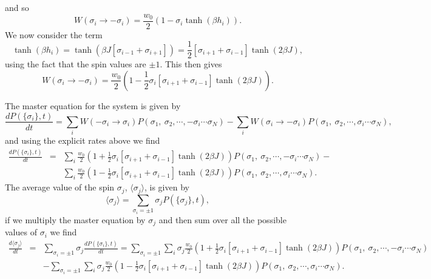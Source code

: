 \documentclass[11pt]{report}
\begin{document}
and so
\begin{equation}
W(\sigma_i\to-\sigma_i)= \frac{w_0}{2}(1- \sigma_i \tanh(\beta h_i)).
\end{equation}
We now consider the term
\begin{equation}
\tanh(\beta h_i) = \tanh(\beta J [\sigma_{i-1}+ \sigma_{i+1}])
= \frac{1}{2}[\sigma_{i+1}+\sigma_{i-1}]\tanh(2\beta J),
\end{equation}
using the fact that the spin values are $\pm 1$. This then gives
\begin{equation}
W(\sigma_i\to-\sigma_i)= \frac{w_0}{2}(1-  \frac{1}{2}\sigma_i[\sigma_{i+1}+\sigma_{i-1}]\tanh(2\beta J)).
\end{equation}

The master equation for the system is given by
\begin{equation}
\frac{dP(\{\sigma_i\},t)}{dt} = \sum_i W(-\sigma_i\to \sigma_i)P(\sigma_1,\ \sigma_2,\cdots, -\sigma_i\cdots \sigma_N)- \sum_i W(\sigma_i\to -\sigma_i)P(\sigma_1,\ \sigma_2,\cdots, \sigma_i\cdots \sigma_N),
\end{equation}
and using the explicit rates above we find
\begin{eqnarray}
\frac{dP(\{\sigma_i\},t)}{dt} &=& \sum_i \frac{w_0}{2}(1+  \frac{1}{2}\sigma_i[\sigma_{i+1}+\sigma_{i-1}]\tanh(2\beta J))P(\sigma_1,\ \sigma_2,\cdots, -\sigma_i\cdots \sigma_N)- \\
&&\sum_i \frac{w_0}{2}(1-  \frac{1}{2}\sigma_i[\sigma_{i+1}+\sigma_{i-1}]\tanh(2\beta J))P(\sigma_1,\ \sigma_2,\cdots, \sigma_i\cdots \sigma_N).
\end{eqnarray}
The average value of the spin $\sigma_j$, $\langle \sigma_j\rangle $,  is given by
\begin{equation}
\langle \sigma_j\rangle = \sum_{\sigma_i=\pm1}\sigma_j P(\{\sigma_j\},t),
\end{equation}
if we multiply the master equation by $\sigma_j$ and then sum over all the possible values of $\sigma_i$ we find
\begin{eqnarray}
\frac{d\langle \sigma_j\rangle }{dt}&=& \sum_{\sigma_i=\pm 1}\sigma_j\frac{dP(\{\sigma_i\},t)}{dt} = \sum_{\sigma_i=\pm1}\sum_i \sigma_j\frac{w_0}{2}(1+  \frac{1}{2}\sigma_i[\sigma_{i+1}+\sigma_{i-1}]\tanh(2\beta J))P(\sigma_1,\ \sigma_2,\cdots, -\sigma_i\cdots \sigma_N) \\
&&-\sum_{\sigma_i=\pm1}\sum_i \sigma_j\frac{w_0}{2}(1-  \frac{1}{2}\sigma_i[\sigma_{i+1}+\sigma_{i-1}]\tanh(2\beta J))P(\sigma_1,\ \sigma_2,\cdots, \sigma_i\cdots \sigma_N).
\end{eqnarray}
\end{document}

